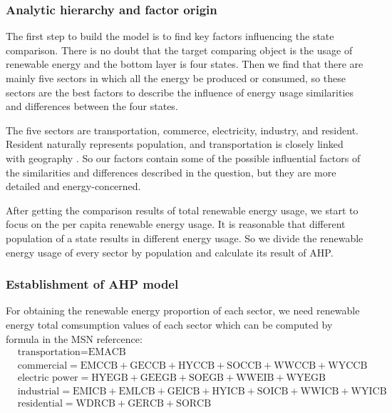 \documentclass[a4paper,11pt]{article}
\begin{document}
\subsubsection{Analytic hierarchy and factor origin}

\par The first step to build the model is to find key factors influencing the state comparison. There is no doubt that the target comparing object is the usage of renewable energy and the bottom layer is four states. Then we find that there are mainly five sectors in which all the energy be produced or consumed, so these sectors are the best factors to describe the influence of energy usage similarities and differences between the four states.

\par The five sectors are transportation, commerce, electricity, industry, and resident. Resident naturally represents population, and transportation is closely linked with geography \cite{L1}. So our factors contain some of the possible influential factors of the similarities and differences described in the question, but they are more detailed and energy-concerned.

\par After getting the comparison results of total renewable energy usage, we start to focus on the per capita renewable energy usage. It is reasonable that different population of a state results in different energy usage. So we divide the renewable energy usage of every sector by population and calculate its result of AHP.

\subsubsection{Establishment of AHP model}

\par For obtaining the renewable energy proportion of each sector, we need renewable energy total comsumption values of each sector which can be computed by formula in the MSN refercence:
\begin{align*}
& \text{transportation} = \text{EMACB} \\
& \text{commercial} = \text{EMCCB} + \text{GECCB} + \text{HYCCB} + \text{SOCCB} + \text{WWCCB} + \text{WYCCB} \\
& \text{electric power} = \text{HYEGB} + \text{GEEGB} + \text{SOEGB} + \text{WWEIB} + \text{WYEGB} \\
& \text{industrial} = \text{EMICB} + \text{EMLCB} + \text{GEICB} + \text{HYICB} + \text{SOICB} + \text{WWICB} + \text{WYICB} \\
& \text{residential} = \text{WDRCB} + \text{GERCB} + \text{SORCB} \\
\end{align*}
\end{document}
